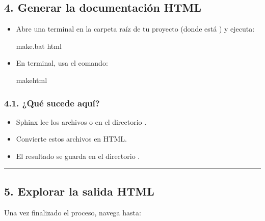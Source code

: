 \documentclass[a4paper,10pt,spanish]{sphinxmanual}
\begin{document}
\subsection{4. Generar la documentación HTML}
\label{\detokenize{configuracion_inicial/008.Generar_HTML:generar-la-documentacion-html}}\begin{itemize}
\item {} 
\sphinxAtStartPar
{}
Abre una terminal en la carpeta raíz de tu proyecto (donde está ) y ejecuta:

\begin{sphinxVerbatim}[commandchars=\\\{\}]
make.bat html
\end{sphinxVerbatim}

\item {} 
\sphinxAtStartPar
{}
En terminal, usa el comando:

\begin{sphinxVerbatim}[commandchars=\\\{\}]
makehtml
\end{sphinxVerbatim}

\end{itemize}


\subsubsection{4.1. ¿Qué sucede aquí?}
\label{\detokenize{configuracion_inicial/008.Generar_HTML:que-sucede-aqui}}\begin{itemize}
\item {} 
\sphinxAtStartPar
Sphinx lee los archivos  o  en el directorio .

\item {} 
\sphinxAtStartPar
Convierte estos archivos en HTML.

\item {} 
\sphinxAtStartPar
El resultado se guarda en el directorio .

\end{itemize}


\bigskip\hrule\bigskip



\subsection{5. Explorar la salida HTML}
\label{\detokenize{configuracion_inicial/008.Generar_HTML:explorar-la-salida-html}}
\sphinxAtStartPar
Una vez finalizado el proceso, navega hasta:
\end{document}
